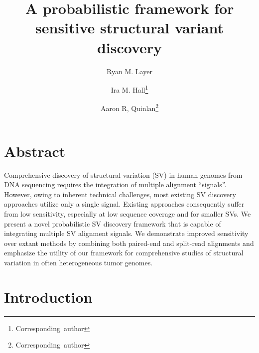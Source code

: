 \documentclass[11pt]{article}
\begin{document}
\title{A probabilistic framework for sensitive structural variant discovery}
%

\author[1]{Ryan M. Layer}
\author[2]{Ira M. Hall\thanks{\mbox{Corresponding author}}}
\author[2,3]{Aaron R, Quinlan\thanks{\mbox{Corresponding author}}}


\maketitle

\section{Abstract}
Comprehensive discovery of structural variation (SV) in human genomes from DNA
sequencing requires the integration of multiple alignment ``signals''. However,
owing to inherent technical challenges, most existing SV discovery approaches 
utilize only a single signal. Existing approaches consequently suffer from
low sensitivity, especially at low sequence coverage and for smaller SVs. We
present a novel probabilistic SV discovery framework that is capable of
integrating multiple SV alignment signals. We demonstrate improved sensitivity
over extant methods by combining both paired-end and split-read alignments and
emphasize the utility of our framework for comprehensive studies of structural
variation in often heterogeneous tumor genomes.


\section{Introduction}
\end{document}
